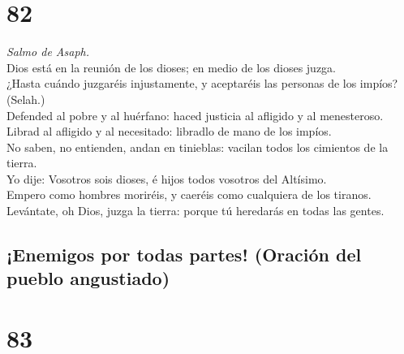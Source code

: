 \hypertarget{section-81}{%
\section{82}\label{section-81}}

 \emph{Salmo de Asaph.}\\
Dios está en la reunión de los dioses; en medio de los dioses juzga.\\
 ¿Hasta cuándo juzgaréis injustamente, y aceptaréis las
personas de los impíos? (Selah.)\\
 Defended al pobre y al huérfano: haced justicia al afligido
y al menesteroso.\\
 Librad al afligido y al necesitado: libradlo de mano de los
impíos.\\
 No saben, no entienden, andan en tinieblas: vacilan todos
los cimientos de la tierra.\\
 Yo dije: Vosotros sois dioses, é hijos todos vosotros del
Altísimo.\\
 Empero como hombres moriréis, y caeréis como cualquiera de
los tiranos.\\
 Levántate, oh Dios, juzga la tierra: porque tú heredarás en
todas las gentes.

\hypertarget{enemigos-por-todas-partes-oraciuxf3n-del-pueblo-angustiado}{%
\subsection{¡Enemigos por todas partes! (Oración del pueblo
angustiado)}\label{enemigos-por-todas-partes-oraciuxf3n-del-pueblo-angustiado}}

\hypertarget{section-82}{%
\section{83}\label{section-82}}

